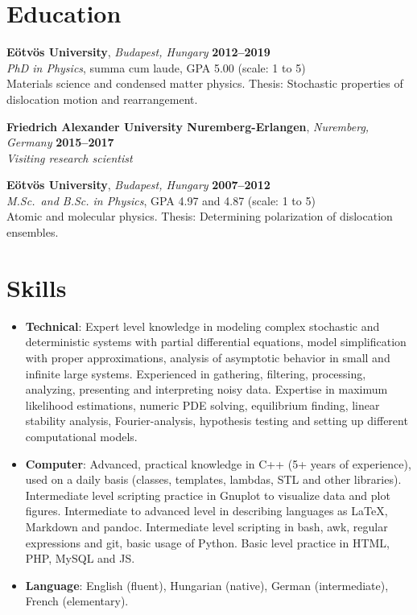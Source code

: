 \documentclass[10pt,USletter,sans]{moderncv}        %
\begin{document}
\makecvtitle
\section{Education}
\textbf{Eötvös University}, \emph{Budapest, Hungary}  \hfill \textbf{2012--2019}\\
\emph{PhD in Physics}, summa cum laude, GPA 5.00 (scale: 1 to 5)\\
Materials science and condensed matter physics. Thesis: Stochastic properties of dislocation motion and rearrangement.  %

\vspace{4pt}
\textbf{Friedrich Alexander University Nuremberg-Erlangen}, \emph{Nuremberg, Germany} \hfill \textbf{2015--2017}\\
\emph{Visiting research scientist}

\vspace{4pt}
\textbf{Eötvös University}, \emph{Budapest, Hungary}  \hfill \textbf{2007--2012}\\
\emph{M.Sc.\ and B.Sc. in Physics}, GPA 4.97 and 4.87 (scale: 1 to 5)\\
Atomic and molecular physics. Thesis: Determining polarization of dislocation ensembles.

\section{Skills}
\begin{itemize}
\item \textbf{Technical}: Expert level knowledge in modeling complex stochastic and deterministic systems with partial differential equations, model simplification with proper approximations, analysis of asymptotic behavior in small and infinite large systems. Experienced in gathering, filtering, processing, analyzing, presenting and interpreting noisy data. Expertise in maximum likelihood estimations, numeric PDE solving, equilibrium finding, linear stability analysis, Fourier-analysis, hypothesis testing and setting up different computational models.
\vspace{4pt}
\item \textbf{Computer}: Advanced, practical knowledge in C++ (5+ years of experience), used on a daily basis (classes, templates, lambdas, STL and other libraries). Intermediate level scripting practice in Gnuplot to visualize data and plot figures. Intermediate to advanced level in describing languages as LaTeX, Markdown and pandoc. Intermediate level scripting in bash, awk, regular expressions and git, basic usage of Python. Basic level practice in HTML, PHP, MySQL and JS.
\vspace{4pt}
\item \textbf{Language}: English (fluent), Hungarian (native), German (intermediate), French (elementary).
\end{itemize}
\end{document}
